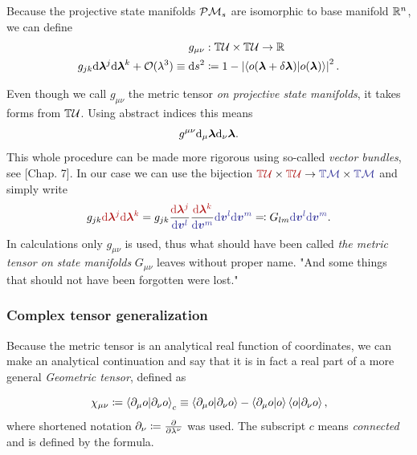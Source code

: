 \begin{definition}
Because the projective state manifolds $\mathcal{P}\mathcal{M}_s$ are isomorphic to base manifold $\mathbb{R}^n$, we can define
    \begin{equation}
        \begin{split}
            g_{\mu\nu}&: \mathbb{T}\mathcal U\times \mathbb{T}\mathcal U\rightarrow \mathbb{R} \\
            g_{jk}\mathrm{d} \bm \lambda^j \mathrm{d}\bm \lambda^k+\mathcal{O}(\lambda^3) \equiv \mathrm{d} s^2 &\coloneqq 1-\left|\braket{o(\bm{{\bm\lambda}}+\delta\bm{{\bm\lambda}})|o(\bm{{\bm\lambda}})}\right|^2.
            \label{eq:metricTensorDef}
        \end{split}
    \end{equation} 
   
\end{definition}
Even though we call $g_{\mu\nu}$ the metric tensor \emph{on projective state manifolds}, it takes forms from $\mathbb{T}\mathcal U$. Using abstract indices this means
\begin{equation}
    g^{\mu\nu}\mathrm{d}_\mu {\bm\lambda} \mathrm{d}_\nu {\bm\lambda}.
\end{equation}
This whole procedure can be made more rigorous using so-called \emph{vector bundles}, see \cite{lu}[Chap. 7]. In our case we can use the bijection $\redd{\T\mathcal U}\times \redd{\T\mathcal U} \rightarrow \bluee{\T\M}\times \bluee{\T\M}$ and simply write
\begin{equation}
    g_{jk}\redd{\d\llambda^j \d\llambda^k} = g_{jk}\frac{\redd{\d\llambda^j}}{\bluee{\d\bm v^l}}\frac{\redd{\d\llambda^k}}{\bluee{\d\bm v^m}} \bluee{\d\bm v^l \d \bm v^m} \eqqcolon G_{lm}\bluee{\d\bm v^l \d \bm v^m}.
\end{equation}
In calculations only $g_{\mu\nu}$ is used, thus what should have been called \emph{the metric tensor on state manifolds} $G_{\mu\nu}$ leaves without proper name. "And some things that should not have been forgotten were lost." \citep{lordOfTheRings}

\subsubsection{Complex tensor generalization}
Because the metric tensor is an analytical real function of coordinates, we can make an analytical continuation and say that it is in fact a real part of a more general \emph{Geometric tensor}, defined as

\begin{equation}
    \chi_{\mu\nu}\coloneqq \braket{\partial_\mu o|\partial_\nu o}_c \equiv \braket{\partial_\mu o|\partial_\nu o} - \braket{\partial_\mu o|o}\braket{o|\partial_\nu o},
    \label{eq:geometricTensor}
\end{equation}
where shortened notation $\partial_\nu\coloneqq\frac{\partial }{\partial \lambda^\nu}$ was used. The subscript $c$ means \emph{connected} and is defined by the formula.


